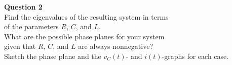 \documentclass[preview]{standalone}
\begin{document}
\begin{center}
\textbf{Question 2} \\[10pt]
            Find the eigenvalues of the resulting system in terms \\  
            of the parameters $R$, $C$, and $L$. \\[5pt]
            What are the possible phase planes for your system \\
            given that $R$, $C$, and $L$ are always nonnegative? \\[5pt]
            Sketch the phase plane and the $v_C(t)$- and $i(t)$-graphs for each case.
\end{center}
\end{document}
